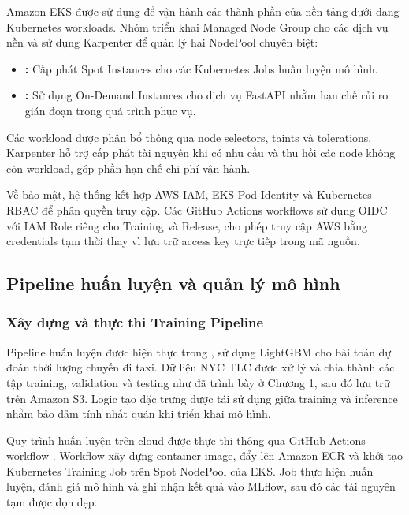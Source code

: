 Amazon EKS được sử dụng để vận hành các thành phần của nền tảng dưới dạng Kubernetes workloads. Nhóm triển khai Managed Node Group  cho các dịch vụ nền và sử dụng Karpenter để quản lý hai NodePool chuyên biệt:


\begin{itemize}

\item 

\textbf{}\textbf{:} Cấp phát Spot Instances cho các Kubernetes Jobs huấn luyện mô hình.


\item 

\textbf{}\textbf{:} Sử dụng On-Demand Instances cho dịch vụ FastAPI nhằm hạn chế rủi ro gián đoạn trong quá trình phục vụ.


\end{itemize}

Các workload được phân bổ thông qua node selectors, taints và tolerations. Karpenter hỗ trợ cấp phát tài nguyên khi có nhu cầu và thu hồi các node không còn workload, góp phần hạn chế chi phí vận hành.


Về bảo mật, hệ thống kết hợp AWS IAM, EKS Pod Identity và Kubernetes RBAC để phân quyền truy cập. Các GitHub Actions workflows sử dụng OIDC với IAM Role riêng cho Training và Release, cho phép truy cập AWS bằng credentials tạm thời thay vì lưu trữ access key trực tiếp trong mã nguồn.


\subsection{Pipeline huấn luyện và quản lý mô hình}


\subsubsection{Xây dựng và thực thi Training Pipeline}


Pipeline huấn luyện được hiện thực trong , sử dụng LightGBM cho bài toán dự đoán thời lượng chuyến đi taxi. Dữ liệu NYC TLC được xử lý và chia thành các tập training, validation và testing như đã trình bày ở Chương 1, sau đó lưu trữ trên Amazon S3. Logic tạo đặc trưng được tái sử dụng giữa training và inference nhằm bảo đảm tính nhất quán khi triển khai mô hình.


Quy trình huấn luyện trên cloud được thực thi thông qua GitHub Actions workflow . Workflow xây dựng container image, đẩy lên Amazon ECR và khởi tạo Kubernetes Training Job trên Spot NodePool của EKS. Job thực hiện huấn luyện, đánh giá mô hình và ghi nhận kết quả vào MLflow, sau đó các tài nguyên tạm được dọn dẹp.


